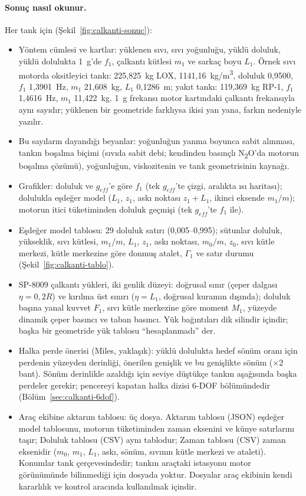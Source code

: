 \documentclass[11pt,a4paper]{article}
\newcommand{\ui}[1]{\textsf{#1}}
\begin{document}
\paragraph{Sonuç nasıl okunur.} Her tank için (Şekil~\ref{fig:calkanti-sonuc}):
\begin{itemize}[leftmargin=1.4em]
  \item Yöntem cümlesi ve kartlar: yüklenen sıvı, sıvı yoğunluğu, yüklü
  doluluk, yüklü dolulukta 1~g'de $f_1$, çalkantı kütlesi $m_1$ ve sarkaç boyu
  $L_1$. Örnek sıvı motorda oksitleyici tankı: 225,825~kg LOX,
  1141,16~kg/m\textsuperscript{3}, doluluk 0,9500, $f_1$ 1,3901~Hz,
  $m_1$ 21,608~kg, $L_1$ 0,1286~m; yakıt tankı: 119,369~kg RP-1, $f_1$
  1,4616~Hz, $m_1$ 11,422~kg. 1~g frekansı motor kartındaki çalkantı
  frekansıyla aynı sayıdır; yüklenen bir geometride farklıysa ikisi yan yana,
  farkın nedeniyle yazılır.
  \item \ui{Bu sayıların dayandığı beyanlar}: yoğunluğun yanma boyunca sabit
  alınması, tankın boşalma biçimi (sıvıda sabit debi; kendinden basınçlı
  N\textsubscript{2}O'da motorun boşalma çözümü), yoğunluğun, viskozitenin ve
  tank geometrisinin kaynağı.
  \item Grafikler: doluluk ve $g_{eff}$'e göre $f_1$ (tek $g_{eff}$'te çizgi,
  aralıkta ısı haritası); dolulukla eşdeğer model ($L_1$, $z_1$, askı noktası
  $z_1 + L_1$, ikinci eksende $m_1/m$); motorun itici tüketiminden doluluk
  geçmişi (tek $g_{eff}$'te $f_1$ ile).
  \item \ui{Eşdeğer model tablosu}: 29 doluluk satırı (0,005--0,995);
  sütunlar doluluk, yükseklik, sıvı kütlesi, $m_1/m$, $L_1$, $z_1$, askı
  noktası, $m_0/m$, $z_0$, sıvı kütle merkezi, kütle merkezine göre donmuş
  atalet, $\Gamma_1$ ve satır durumu (Şekil~\ref{fig:calkanti-tablo}).
  \item \ui{SP-8009 çalkantı yükleri, iki genlik düzeyi}: doğrusal sınır
  (çeper dalgası $\eta = 0{,}2R$) ve kırılma üst sınırı ($\eta = L_1$, doğrusal
  kuramın dışında); doluluk başına yanal kuvvet $F_1$, sıvı kütle merkezine
  göre moment $M_1$, yüzeyde dinamik çeper basıncı ve taban basıncı. Yük
  bağıntıları dik silindir içindir; başka bir geometride yük tablosu
  ``hesaplanmadı'' der.
  \item \ui{Halka perde önerisi (Miles, yaklaşık)}: yüklü dolulukta hedef sönüm
  oranı için perdenin yüzeyden derinliği, önerilen genişlik ve bu genişlikte
  sönüm (×2 bant). Sönüm derinlikle azaldığı için seviye düştükçe tankın
  aşağısında başka perdeler gerekir; pencereyi kapatan halka dizisi 6-DOF
  bölümündedir (Bölüm~\ref{sec:calkanti-6dof}).
  \item \ui{Araç ekibine aktarım tablosu}: üç dosya. \ui{Aktarım tablosu
  (JSON)} eşdeğer model tablosunu, motorun tüketiminden zaman eksenini ve künye
  satırlarını taşır; \ui{Doluluk tablosu (CSV)} aynı tablodur; \ui{Zaman tablosu
  (CSV)} zaman eksenidir ($m_0$, $m_1$, $L_1$, askı, sönüm, sıvının kütle merkezi
  ve ataleti). Konumlar tank çerçevesindedir; tankın araçtaki istasyonu motor
  görünümünde bilinmediği için dosyada yoktur. Dosyalar araç ekibinin kendi
  kararlılık ve kontrol aracında kullanılmak içindir.
\end{itemize}
\end{document}
